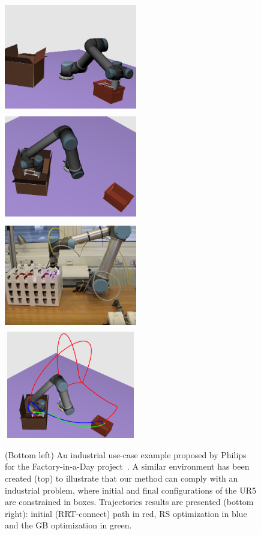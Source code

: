 \documentclass{tADR2e}
\begin{document}
\begin{figure}
	\centering
	\includegraphics[width=5.8cm,height=4.7cm]{fiad_qinit.png}
	\includegraphics[width=5.8cm,height=4.7cm]{fiad_qfinal.png}\\
	\includegraphics[width=5.8cm,height=4.7cm]{fiad_real.png}
	\includegraphics[width=5.8cm,height=4.7cm]{fiad-trajectorires.png}
	\caption{(Bottom left) An industrial use-case example proposed by Philips for 	
	the Factory-in-a-Day project~\cite{factory-day-video}. A similar environment 	
	has been created (top) to illustrate that our method can comply with an 
	industrial problem, where initial and final configurations of the UR5 are 
	constrained in boxes. Trajectories results 
	are presented (bottom right): initial (RRT-connect) path in red, RS 
	optimization in blue and the GB optimization in green.}
	\label{fiad}
\end{figure}
\end{document}
